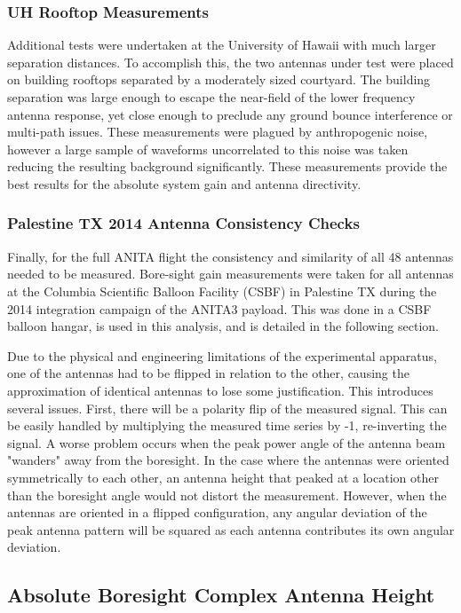 		\subsubsection{UH Rooftop Measurements}
	Additional tests were undertaken at the University of Hawaii with much larger separation distances.  To accomplish this, the two antennas under test were placed on building rooftops separated by a moderately sized courtyard.  The building separation was large enough to escape the near-field of the lower frequency antenna response, yet close enough to preclude any ground bounce interference or multi-path issues.  These measurements were plagued by anthropogenic noise, however a large sample of waveforms uncorrelated to this noise was taken reducing the resulting background significantly.  These measurements provide the best results for the absolute system gain and antenna directivity.
	
		\subsubsection{Palestine TX 2014 Antenna Consistency Checks}
	Finally, for the full ANITA flight the consistency and similarity of all 48 antennas needed to be measured.  Bore-sight gain measurements were taken for all antennas at the Columbia Scientific Balloon Facility (CSBF) in Palestine TX during the 2014 integration campaign of the ANITA3 payload.  This was done in a CSBF balloon hangar, is used in this analysis, and is detailed in the following section.
	
	Due to the physical and engineering limitations of the experimental apparatus, one of the antennas had to be flipped in relation to the other, causing the approximation of identical antennas to lose some justification.  This introduces several issues.  First, there will be a polarity flip of the measured signal.  This can be easily handled by multiplying the measured time series by -1, re-inverting the signal.  A worse problem occurs when the peak power angle of the antenna beam "wanders" away from the boresight.  In the case where the antennas were oriented symmetrically to each other, an antenna height that peaked at a location other than the boresight angle would not distort the measurement.  However, when the antennas are oriented in a flipped configuration, any angular deviation of the peak antenna pattern will be squared as each antenna contributes its own angular deviation.  
	
	
	
	\subsection{Absolute Boresight Complex Antenna Height}
		
